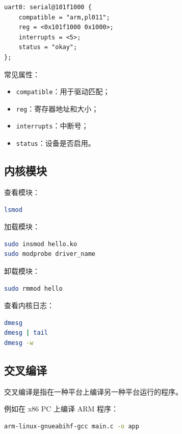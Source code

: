 \documentclass[UTF8,a4paper,12pt]{ctexart}
\begin{document}
\begin{lstlisting}
uart0: serial@101f1000 {
    compatible = "arm,pl011";
    reg = <0x101f1000 0x1000>;
    interrupts = <5>;
    status = "okay";
};
\end{lstlisting}

常见属性：
\begin{itemize}
    \item \texttt{compatible}：用于驱动匹配；
    \item \texttt{reg}：寄存器地址和大小；
    \item \texttt{interrupts}：中断号；
    \item \texttt{status}：设备是否启用。
\end{itemize}

\subsection{内核模块}

查看模块：

\begin{lstlisting}[language=bash]
lsmod
\end{lstlisting}

加载模块：

\begin{lstlisting}[language=bash]
sudo insmod hello.ko
sudo modprobe driver_name
\end{lstlisting}

卸载模块：

\begin{lstlisting}[language=bash]
sudo rmmod hello
\end{lstlisting}

查看内核日志：

\begin{lstlisting}[language=bash]
dmesg
dmesg | tail
dmesg -w
\end{lstlisting}

\subsection{交叉编译}

交叉编译是指在一种平台上编译另一种平台运行的程序。

例如在 x86 PC 上编译 ARM 程序：

\begin{lstlisting}[language=bash]
arm-linux-gnueabihf-gcc main.c -o app
\end{lstlisting}
\end{document}
